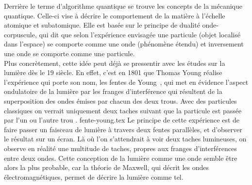 Derrière le terme d'algorithme quantique se trouve les concepts de la mécanique quantique.
Celle-ci vise à décrire le comportement de la matière à l'échelle atomique et subatomique.
Elle est basée sur le principe de dualité onde-corpuscule, qui dit que selon l’expérience envisagée une particule
(objet localisé dans l’espace) se comporte comme une onde (phénomène étendu) et inversement une onde se
comporte comme une particule.\\
Plus concrètement, cette idée peut déjà se pressentir avec les études sur la lumière dès le 19 siècle.
En effet, c'est en 1801 que Thomas Young réalise l'expérience qui porte son nom, les fentes de Young~\cite{wiki:young},
qui met en évidence l’aspect ondulatoire de la lumière par les franges d’interférence qui résultent de la superposition
des ondes émises par chacun des deux trous.
Avec des particules classiques on verrait uniquement deux taches suivant que la particule est passée par l’un ou l’autre trou .
{fente-young.tex}
Le principe de cette expérience est de faire passer un faisceau de lumière à travers deux fentes
parallèles, et d'observer le résultat sur un écran.
Là où l'on s'attendrait à voir deux taches lumineuses, on observe en réalité une multitude de
taches, propres aux franges d'interférences entre deux ondes.
Cette conception de la lumière comme une onde semble être alors la plus probable, car la théorie de
Maxwell, qui décrit les ondes électromagnétiques, permet de décrire la lumière comme tel.\\ \\
